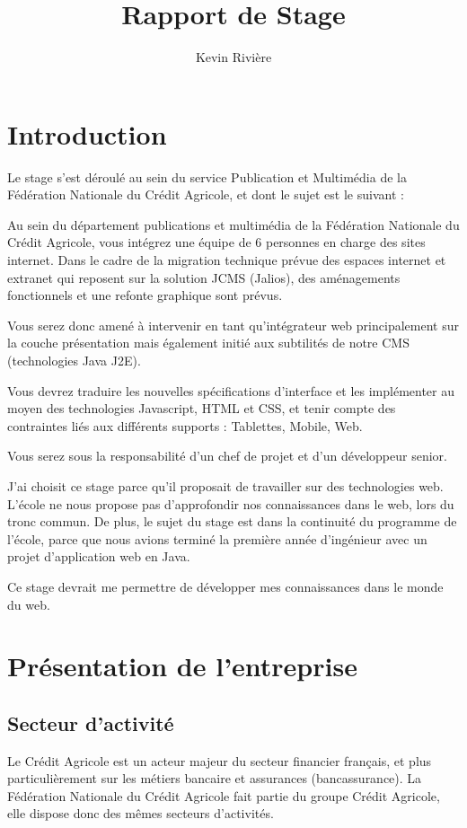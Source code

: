 \documentclass[12pt,a4paper]{article}
\author{Kevin Rivière}
\title{Rapport de Stage}
\begin{document}
\maketitle
\thispagestyle{empty}
\setcounter{page}{0}
\newpage

\tableofcontents
\thispagestyle{empty}
\setcounter{page}{0}
\newpage

\section{Introduction}
Le stage s'est déroulé au sein du service Publication et Multimédia de la Fédération Nationale du Crédit Agricole, et dont le sujet est le suivant :\par 
\medskip
Au sein du département publications et multimédia de la Fédération Nationale du Crédit Agricole, vous intégrez une équipe de 6 personnes en charge des sites internet. Dans le cadre de la migration technique prévue des espaces internet et extranet qui reposent sur la solution JCMS (Jalios), des aménagements fonctionnels et une refonte graphique sont prévus.\par
Vous serez donc amené à intervenir en tant qu’intégrateur web principalement sur la couche présentation mais également initié aux subtilités de notre CMS (technologies Java J2E).\par
Vous devrez traduire les nouvelles spécifications d’interface et les implémenter au moyen des technologies Javascript, HTML et CSS, et tenir compte des contraintes liés aux différents supports : Tablettes, Mobile, Web.\par 
Vous serez sous la responsabilité d’un chef de projet et d’un développeur senior.\par 
\medskip
J'ai choisit ce stage parce qu'il proposait de travailler sur des technologies web. L'école ne nous propose pas d'approfondir nos connaissances dans le web, lors du tronc commun. De plus, le sujet du stage est dans la continuité du programme de l'école, parce que nous avions terminé la première année d'ingénieur avec un projet d'application web en Java.\par 
\medskip
Ce stage devrait me permettre de développer mes connaissances dans le monde du web. 

\newpage

\section{Présentation de l'entreprise}
\subsection{Secteur d'activité}
Le Crédit Agricole est un acteur majeur du secteur financier français, et plus particulièrement sur les métiers bancaire et assurances (bancassurance).
La Fédération Nationale du Crédit Agricole fait partie du groupe Crédit Agricole, elle dispose donc des mêmes secteurs d'activités.\par
\end{document}
